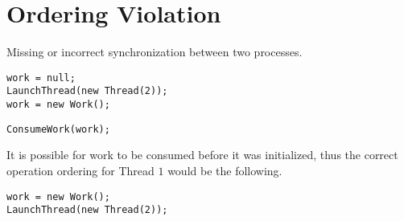 \section{Ordering Violation}

Missing or incorrect synchronization between two processes.

\begin{lstlisting}[caption={Simple Producer, running on Thread $1$}]
work = null;
LaunchThread(new Thread(2));
work = new Work();
\end{lstlisting}

\begin{lstlisting}[caption={Simple Consumer, running on Thread $2$}]
ConsumeWork(work);
\end{lstlisting}

It is possible for work to be consumed before it was initialized,
thus the correct operation ordering for Thread $1$ would be the following.

\begin{lstlisting}[caption={Simple Correct Producer, running on Thread $1$}]
work = new Work();
LaunchThread(new Thread(2));
\end{lstlisting}
